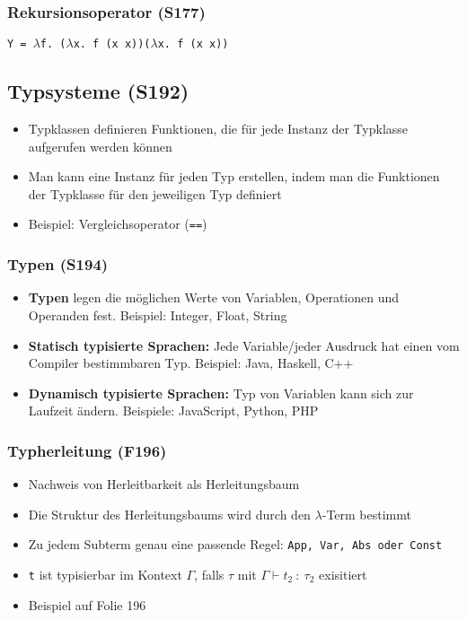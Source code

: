 \subsubsection{Rekursionsoperator (S177)}
\texttt{Y = \(\lambda\)f. (\(\lambda\)x. f (x x))(\(\lambda\)x. f (x x))}


\subsection{Typsysteme (S192)}
\begin{itemize}
	\item Typklassen definieren Funktionen, die für jede Instanz der Typklasse aufgerufen werden können
	\item Man kann eine Instanz für jeden Typ erstellen, indem man die Funktionen der Typklasse für den jeweiligen Typ definiert
	\item Beispiel: Vergleichsoperator (\texttt{==})
\end{itemize}

\subsubsection{Typen (S194)}
\begin{itemize}
	\item \textbf{Typen} legen die möglichen Werte von Variablen, Operationen und Operanden fest. Beispiel: Integer, Float, String
	\item \textbf{Statisch typisierte Sprachen:} Jede Variable/jeder Ausdruck hat einen vom Compiler bestimmbaren Typ. Beispiel: Java, Haskell, C++
	\item \textbf{Dynamisch typisierte Sprachen:} Typ von Variablen kann sich zur Laufzeit ändern. Beispiele: JavaScript, Python, PHP
\end{itemize}

\subsubsection{Typherleitung (F196)}
\begin{itemize}
	\item Nachweis von Herleitbarkeit als Herleitungsbaum
	\item Die Struktur des Herleitungsbaums wird durch den \(\lambda\)-Term bestimmt
	\item Zu jedem Subterm genau eine passende Regel: \texttt{App, Var, Abs oder Const}
	\item \texttt{t} ist typisierbar im Kontext \(\Gamma\), falls \(\tau\) mit \(\Gamma\vdash t_2~:~\tau_2\) exisitiert
	\item Beispiel auf Folie 196
\end{itemize}


